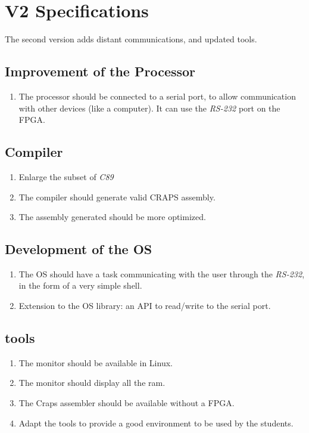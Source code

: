 \documentclass{article}
\begin{document}
    \section{V2 Specifications}
      The second version adds distant communications, and updated tools.

      \subsection{Improvement of the Processor}
        \begin{enumerate}
          \item The processor should be connected to a serial port, to allow
            communication with other devices (like a computer). It can use the
            \textit{RS-232} port on the FPGA.
        \end{enumerate}

      \subsection{Compiler}
        \begin{enumerate}
          \item Enlarge the subset of \textit{C89}
          \item The compiler should generate valid CRAPS assembly.
          \item The assembly generated should be more optimized.
        \end{enumerate}

      \subsection{Development of the OS}
        \begin{enumerate}
          \item The OS should have a task communicating with the user through
            the \textit{RS-232}, in the form of a very simple shell.
          \item Extension to the OS library: an API to read/write to the serial
            port.
        \end{enumerate}
      \subsection{tools}
        \begin{enumerate}
          \item The monitor should be available in Linux.
          \item The monitor should display all the ram.
          \item The Craps assembler should be available without a FPGA.
          \item Adapt the tools to provide a good environment to be used by the
            students.
        \end{enumerate}
\end{document}
